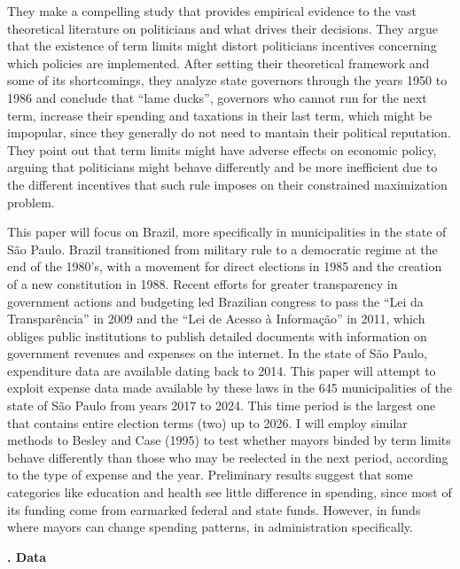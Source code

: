 \documentclass[12pt, a4paper]{article}
\newcounter{headercounter}
\newcommand{\header}[1]{\begin{center}{\large \textbf{\Roman{headercounter}. #1}} \end{center} \stepcounter{headercounter}}
\begin{document}
They make a compelling study that provides empirical evidence to the vast theoretical literature on politicians and what drives their decisions. They argue that the existence of term limits might distort politicians incentives concerning which policies are implemented. After setting their theoretical framework and some of its shortcomings, they analyze state governors through the years 1950 to 1986 and conclude that ``lame ducks'', governors who cannot run for the next term, increase their spending and taxations in their last term, which might be impopular, since they generally do not need to mantain their political reputation. They point out that term limits might have adverse effects on economic policy, arguing that politicians might behave differently and be more inefficient due to the different incentives that such rule imposes on their constrained maximization problem.

This paper will focus on Brazil, more specifically in municipalities in the state of São Paulo. Brazil transitioned from military rule to a democratic regime at the end of the 1980's, with a movement for direct elections in 1985 and the creation of a new constitution in 1988. Recent efforts for greater transparency in government actions and budgeting led Brazilian congress to pass the ``Lei da Transparência'' in 2009 and the ``Lei de Acesso à Informação'' in 2011, which obliges public institutions to publish detailed documents with information on government revenues and expenses on the internet. In the state of São Paulo, expenditure data are available dating back to 2014. This paper will attempt to exploit expense data made available by these laws in the 645 municipalities of the state of São Paulo from years 2017 to 2024. This time period is the largest one that contains entire election terms (two) up to 2026. I will employ similar methods to Besley and Case (1995) to test whether mayors binded by term limits behave differently than those who may be reelected in the next period, according to the type of expense and the year. Preliminary results suggest that some categories like education and health see little difference in spending, since most of its funding come from earmarked federal and state funds. However, in funds where mayors can change spending patterns, in administration specifically.

\header{Data}
\end{document}
